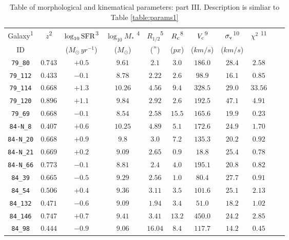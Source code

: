 \newpage
\begin{table}[htbp]
	\centering
	\vspace{-250pt}

	\begin{tabular}{c c c c c c c c c c c}

\hline
Galaxy\textsuperscript{1} & $z$\textsuperscript{2} & $\log_{10} \rm{SFR}$\textsuperscript{3} & $\log_{10} M_{*}$ \textsuperscript{4} & $R_{1/2}$\textsuperscript{5} & $R_{\rm{c}}$\textsuperscript{8} & $V_{\rm{c}}$\textsuperscript{9} & $\sigma_{\rm{v}}$\textsuperscript{10} & $\chi^2$ \textsuperscript{11} \\
ID & & ($\si{M_{\odot} \, yr^{-1}}$) & ($\si{M_{\odot}}$) & ($\si{"}$) & ($\si{px}$) & ($\si{km/s}$) & ($\si{km/s}$) & \\
\hline

\texttt{79\_80}         & $0.743$ & $+0.5$ & $9.61 $ & $2.1  $ & $3.0 $ & $186.0$ & $28.4$ & $2.58$ \\
\texttt{79\_112}        & $0.433$ & $-0.1$ & $8.78 $ & $2.22 $ & $2.6 $ & $98.9 $ & $16.1$ & $0.85$ \\
\texttt{79\_114}        & $0.668$ & $+1.3$ & $10.26$ & $4.56 $ & $9.4 $ & $328.5$ & $29.0$ & $33.56$ \\
\texttt{79\_120}        & $0.896$ & $+1.1$ & $9.84 $ & $2.92 $ & $2.6 $ & $192.5$ & $47.1$ & $4.91$ \\
\texttt{79\_69}         & $0.668$ & $-0.1$ & $8.54 $ & $2.58 $ & $15.5$ & $165.6$ & $19.9$ & $0.23$ \\
\texttt{84-N\_8}        & $0.407$ & $+0.6$ & $10.25$ & $4.89 $ & $5.1 $ & $172.6$ & $24.9$ & $1.70$ \\
\texttt{84-N\_20}       & $0.668$ & $+0.9$ & $9.8  $ & $3.0  $ & $7.2 $ & $135.3$ & $20.2$ & $0.92$ \\
\texttt{84-N\_21}       & $0.669$ & $+0.2$ & $9.09 $ & $2.65 $ & $0.9 $ & $18.8 $ & $25.4$ & $0.78$ \\
\texttt{84-N\_66}       & $0.773$ & $-0.1$ & $8.81 $ & $2.4  $ & $4.0 $ & $195.1$ & $20.8$ & $0.82$ \\
\texttt{84\_39}         & $0.665$ & $-0.5$ & $9.29 $ & $2.56 $ & $1.0 $ & $80.4 $ & $27.7$ & $0.91$ \\
\texttt{84\_54}         & $0.506$ & $+0.4$ & $9.36 $ & $3.11 $ & $3.5 $ & $101.6$ & $25.1$ & $2.13$ \\
\texttt{84\_132}        & $0.471$ & $-0.6$ & $9.09 $ & $1.94 $ & $3.4 $ & $51.0 $ & $18.2$ & $1.02$ \\
\texttt{84\_146}        & $0.747$ & $+0.7$ & $9.41 $ & $3.41 $ & $13.2$ & $450.0$ & $24.2$ & $2.85$ \\
\texttt{84\_98}         & $0.444$ & $-0.9$ & $9.06 $ & $16.04$ & $8.4 $ & $117.7$ & $14.2$ & $0.45$ \\



	\end{tabular}
\caption[Morpho-kinematical parameters III]{Table of morphological and kinematical parameters: part III. Description is simliar to Table \ref{table:params1}}
\label{table:params3}
\end{table}













